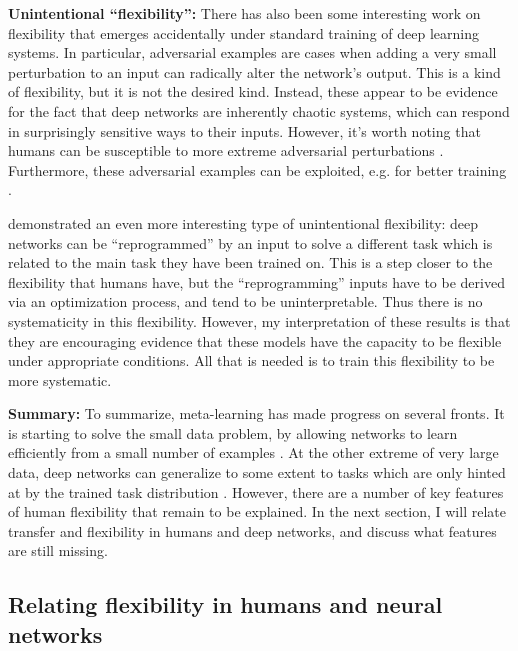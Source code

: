 \documentclass[11pt]{article}
\begin{document}
\textbf{Unintentional ``flexibility'':} There has also been some interesting work on flexibility that emerges accidentally under standard training of deep learning systems. In particular, adversarial examples \citep{SzegedyAdv} are cases when adding a very small perturbation to an input can radically alter the network's output. This is a kind of flexibility, but it is not the desired kind. Instead, these appear to be evidence for the fact that deep networks are inherently chaotic systems, which can respond in surprisingly sensitive ways to their inputs. However, it's worth noting that humans can be susceptible to more extreme adversarial perturbations \citep{Elsayed2018}. Furthermore, these adversarial examples can be exploited, e.g. for better training \citep{Goodfellow2015}. \par 
\citet{Elsayed} demonstrated an even more interesting type of unintentional flexibility: deep networks can be ``reprogrammed'' by an input to solve a different task which is related to the main task they have been trained on. This is a step closer to the flexibility that humans have, but the ``reprogramming'' inputs have to be derived via an optimization process, and tend to be uninterpretable. Thus there is no systematicity in this flexibility. However, my interpretation of these results is that they are encouraging evidence that these models have the capacity to be flexible under appropriate conditions. All that is needed is to train this flexibility to be more systematic. \par  
\textbf{Summary:} To summarize, meta-learning has made progress on several fronts. It is starting to solve the small data problem, by allowing networks to learn efficiently from a small number of examples \citep[e.g.]{Wang2016a}. At the other extreme of very large data, deep networks can generalize to some extent to tasks which are only hinted at by the trained task distribution \citep[e.g.]{Radford2019}. However, there are a number of key features of human flexibility that remain to be explained. In the next section, I will relate transfer and flexibility in humans and deep networks, and discuss what features are still missing. \par 

\subsection{Relating flexibility in humans and neural networks}
\end{document}
